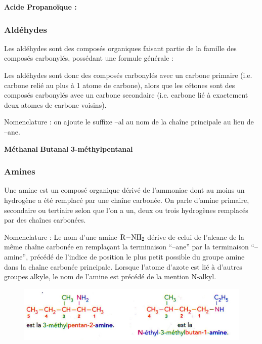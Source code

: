 \documentclass[11pt,a4paper]{article}
\begin{document}
\begin{eg}

\textbf{Acide Propanoïque : }  \quad \quad \quad \quad {}

\end{eg}

\subsubsection*{Aldéhydes}
Les aldéhydes sont des composés organiques faisant partie de la famille des composés carbonylés, possédant une formule générale : 

 
Les aldéhydes sont donc des composés carbonylés avec un carbone primaire (i.e. carbone relié au plus à 1 atome de carbone), alors que les cétones sont des composés carbonylés avec un carbone secondaire (i.e. carbone lié à exactement deux atomes de carbone voisins). 

Nomenclature : on ajoute le suffixe –al au nom de la chaîne principale au lieu de –ane. 

\begin{eg}
\textbf{Méthanal} \hspace{3.5cm} \textbf{Butanal} \hspace{3.5cm} \textbf{3-méthylpentanal}
\vspace{3cm}
\end{eg}

\subsubsection*{Amines}
Une amine est un composé organique dérivé de l’ammoniac dont au moins un hydrogène a été remplacé par une chaîne carbonée. On parle d’amine primaire, secondaire ou tertiaire selon que l’on a un, deux ou trois hydrogènes remplacés par des chaînes carbonées.  

Nomenclature : Le nom d’une amine $\ce{R-NH2}$  dérive de celui de l’alcane de la même chaîne carbonée en remplaçant la terminaison ``–ane'' par la terminaison ``–amine'', précédé de l’indice de position le plus petit possible du groupe amine dans la chaîne carbonée principale. Lorsque l’atome d’azote est lié à d’autres groupes alkyle, le nom de l’amine est précédé de la mention N-alkyl.

\begin{figure}[h]
    \centering
    \includegraphics[width=0.85\linewidth]{imgs/c5/exAmine.jpg}
\end{figure}
\end{document}
